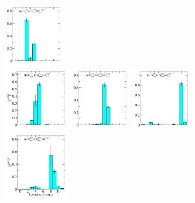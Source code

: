 \begin{figure}
  \includegraphics[width=0.28\textwidth]{figures/spectrum_a1gm/no_tq/zfactors/zfactor_isotriplet_phi_pion-A1gm_1-P001-A2p-SS_1-P00-1-A2m-SS_1.pdf}\\
  \includegraphics[width=0.304\textwidth]{figures/spectrum_a1gm/no_tq/zfactors/zfactor_isotriplet_kaon_kbar-A1gm_1-P001-A2-SS_1-P00-1-A2-SS_1.pdf}
  \includegraphics[width=0.28\textwidth]{figures/spectrum_a1gm/no_tq/zfactors/zfactor_isotriplet_phi_pion-A1gm_1-P011-A2p-SS_0-P0-1-1-A2m-SS_0.pdf}
  \includegraphics[width=0.28\textwidth]{figures/spectrum_a1gm/no_tq/zfactors/zfactor_isotriplet_eta_pion-A1gm_1-P001-A2p-SS_0-P00-1-A2m-SS_0.pdf}\\
  \includegraphics[width=0.304\textwidth]{figures/spectrum_a1gm/no_tq/zfactors/zfactor_isotriplet_eta_pion-A1gm_1-P011-A2p-SS_1-P0-1-1-A2m-SS_1.pdf}

\end{figure}
